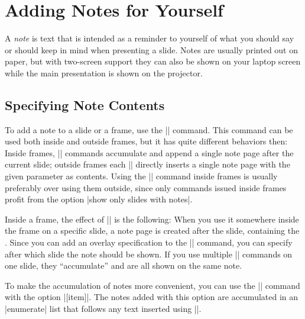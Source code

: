 %
%
%

\section{Adding Notes for Yourself}

A \emph{note} is text that is intended as a reminder to yourself of what you should say or should keep in mind when presenting a slide. Notes are usually printed out on paper, but with two-screen support they can also be shown on your laptop screen while the main presentation is shown on the projector.


\subsection{Specifying Note Contents}

To add a note to a slide or a frame, use the |\note| command. This command can be used both inside and outside frames, but it has quite different behaviors then: Inside frames, |\note| commands accumulate and append a single note page after the current slide; outside frames each |\note| directly inserts a single note page with the given parameter as contents. Using the |\note| command inside frames is usually preferably over using them outside, since only commands issued inside frames profit from the option |show only slides with notes|.

Inside a frame, the effect of |\note| is the following: When you use it somewhere inside the frame on a specific slide, a note page is created after the slide, containing the . Since you can add an overlay specification to the |\note| command, you can specify after which slide the note should be shown. If you use multiple |\note| commands on one slide, they ``accumulate'' and are all shown on the same note.

To make the accumulation of notes more convenient, you can use the |\note| command with the option |[item]|. The notes added with this option are accumulated in an |enumerate| list that follows any text inserted using |\note|.

